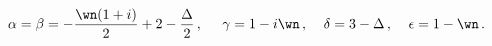 \begin{equation}
\alpha = \beta = -{\wn (1+i)\over 2} + 2 - {\Delta \over 2}\,,
\;\;\; \;\; \gamma = 1 - i \wn \,,\;\;\;\; \delta = 3 - \Delta\,, 
\;\;\;\; \epsilon = 1- \wn\,. 
\label{massive_parameters}
\end{equation}

